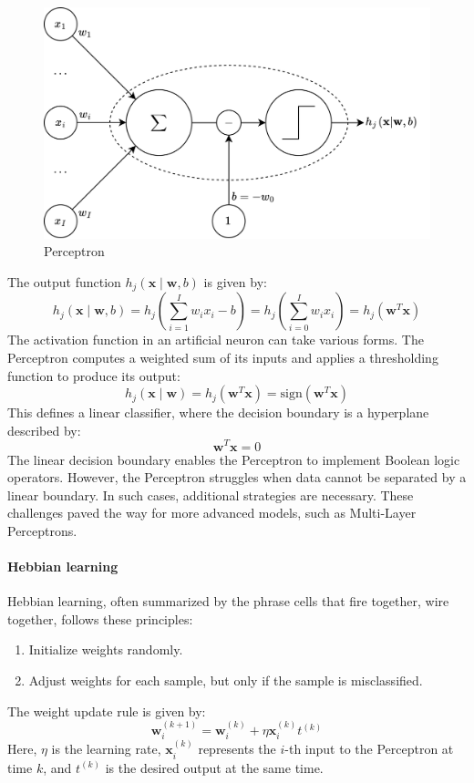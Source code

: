 \begin{figure}[H]
    \centering
    \includegraphics[width=0.75\linewidth]{images/neuron.png}
    \caption{Perceptron}
\end{figure}
\noindent The output function $h_j(\mathbf{x}\mid\mathbf{w},b)$ is given by:
\[h_j(\mathbf{x}\mid\mathbf{w},b)=h_j\left(\sum_{i=1}^Iw_ix_i-b\right)=h_j\left(\sum_{i=0}^Iw_ix_i\right)=h_j\left(\mathbf{w}^T\mathbf{x}\right)\]
\noindent The activation function in an artificial neuron can take various forms.
The Perceptron computes a weighted sum of its inputs and applies a thresholding function to produce its output:
\[h_j(\mathbf{x}\mid\mathbf{w})=h_j\left(\mathbf{w}^T\mathbf{x}\right)=\text{sign}(\mathbf{w}^T\mathbf{x})\]
This defines a linear classifier, where the decision boundary is a hyperplane described by:
\[\mathbf{w}^T\mathbf{x}=0\]
The linear decision boundary enables the Perceptron to implement Boolean logic operators. 
However, the Perceptron struggles when data cannot be separated by a linear boundary.
In such cases, additional strategies are necessary. 
These challenges paved the way for more advanced models, such as Multi-Layer Perceptrons.

\paragraph*{Hebbian learning}
Hebbian learning, often summarized by the phrase cells that fire together, wire together, follows these principles:
\begin{enumerate}
    \item Initialize weights randomly.
    \item Adjust weights for each sample, but only if the sample is misclassified.
\end{enumerate}
The weight update rule is given by:
\[\mathbf{w}_i^{(k+1)}=\mathbf{w}_i^{(k)}+\eta \mathbf{x}_i^{(k)}t^{(k)}\]
Here, $\eta$ is the learning rate, $\mathbf{x}_i^{(k)}$ represents the $i$-th input to the Perceptron at time $k$, and $t^{(k)}$ is the desired output at the same time. 